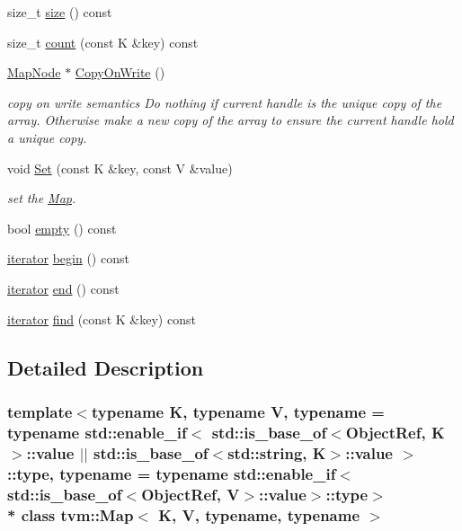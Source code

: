 \begin{DoxyCompactItemize}
size\+\_\+t \hyperlink{classtvm_1_1Map_aef62a3d36a718533366951bec5b64880}{size} () const 
\item 
size\+\_\+t \hyperlink{classtvm_1_1Map_a0e225214f7d7b360f2e73796abe7992a}{count} (const K \&key) const 
\item 
\hyperlink{classtvm_1_1MapNode}{Map\+Node} $\ast$ \hyperlink{classtvm_1_1Map_a0398bb9f0d33835a07f187d7e052b34d}{Copy\+On\+Write} ()
\begin{DoxyCompactList}\small\item\em copy on write semantics Do nothing if current handle is the unique copy of the array. Otherwise make a new copy of the array to ensure the current handle hold a unique copy. \end{DoxyCompactList}\item 
void \hyperlink{classtvm_1_1Map_a01b57ff1ef565738f8ab391a5e4d5f7d}{Set} (const K \&key, const V \&value)
\begin{DoxyCompactList}\small\item\em set the \hyperlink{classtvm_1_1Map}{Map}. \end{DoxyCompactList}\item 
bool \hyperlink{classtvm_1_1Map_a7f5b744e65b40aca81a167cec715ec2a}{empty} () const 
\item 
\hyperlink{classtvm_1_1Map_ac692b6c03df9de0b1d49f719bf659ee1}{iterator} \hyperlink{classtvm_1_1Map_abd05e398b026981426bce7c45c51e0aa}{begin} () const 
\item 
\hyperlink{classtvm_1_1Map_ac692b6c03df9de0b1d49f719bf659ee1}{iterator} \hyperlink{classtvm_1_1Map_a0b475776d062f8fc32842e054d5674bd}{end} () const 
\item 
\hyperlink{classtvm_1_1Map_ac692b6c03df9de0b1d49f719bf659ee1}{iterator} \hyperlink{classtvm_1_1Map_a73c0a4bda4da7adceebe743274a9d7a8}{find} (const K \&key) const 
\end{DoxyCompactItemize}


\subsection{Detailed Description}
\subsubsection*{template$<$typename K, typename V, typename = typename std\+::enable\+\_\+if$<$           std\+::is\+\_\+base\+\_\+of$<$\+Object\+Ref, K$>$\+::value $\vert$$\vert$           std\+::is\+\_\+base\+\_\+of$<$std\+::string, K$>$\+::value $>$\+::type, typename = typename std\+::enable\+\_\+if$<$std\+::is\+\_\+base\+\_\+of$<$\+Object\+Ref, V$>$\+::value$>$\+::type$>$\\*
class tvm\+::\+Map$<$ K, V, typename, typename $>$}

